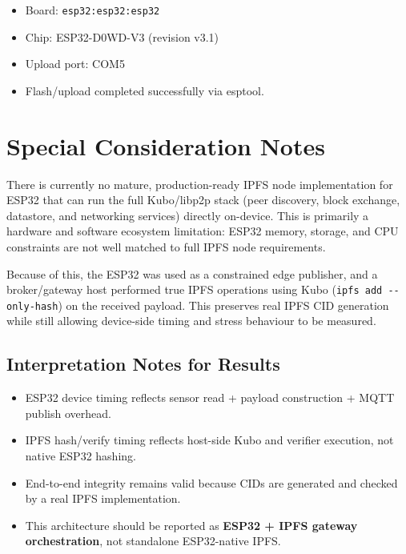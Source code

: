 \documentclass[11pt,letterpaper]{article}
\newcommand{\code}[1]{\texttt{#1}}
\begin{document}
\begin{itemize}[noitemsep]
    \item Board: \code{esp32:esp32:esp32}
    \item Chip: ESP32-D0WD-V3 (revision v3.1)
    \item Upload port: COM5
    \item Flash/upload completed successfully via esptool.
\end{itemize}

\section{Special Consideration Notes}

There is currently no mature, production-ready IPFS node implementation for ESP32
that can run the full Kubo/libp2p stack (peer discovery, block exchange, datastore,
and networking services) directly on-device.  This is primarily a hardware and
software ecosystem limitation: ESP32 memory, storage, and CPU constraints are not
well matched to full IPFS node requirements.

Because of this, the ESP32 was used as a constrained edge publisher, and a
broker/gateway host performed true IPFS operations using Kubo
(\code{ipfs add -{}-only-hash}) on the received payload.  This preserves real IPFS
CID generation while still allowing device-side timing and stress behaviour to be
measured.

\subsection*{Interpretation Notes for Results}

\begin{itemize}[noitemsep]
    \item ESP32 device timing reflects sensor read + payload construction + MQTT
          publish overhead.
    \item IPFS hash/verify timing reflects host-side Kubo and verifier execution,
          not native ESP32 hashing.
    \item End-to-end integrity remains valid because CIDs are generated and checked
          by a real IPFS implementation.
    \item This architecture should be reported as \textbf{ESP32 + IPFS gateway
          orchestration}, not standalone ESP32-native IPFS.
\end{itemize}
\end{document}
